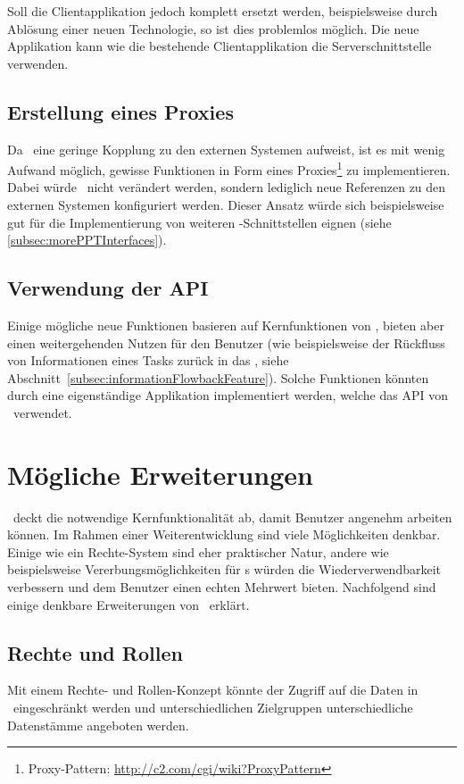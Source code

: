 			Soll die Clientapplikation jedoch komplett ersetzt werden, beispielsweise durch Ablösung einer neuen Technologie, so ist dies problemlos möglich.
			Die neue Applikation kann wie die bestehende Clientapplikation die Serverschnittstelle verwenden.
			

		\subsection{Erstellung eines Proxies}
			Da \eeppi\ eine geringe Kopplung zu den externen Systemen aufweist,
			 ist es mit wenig Aufwand möglich,
			gewisse Funktionen in Form eines Proxies\footnote{Proxy-Pattern: \url{http://c2.com/cgi/wiki?ProxyPattern}} zu implementieren.
			Dabei würde \eeppi\ nicht verändert werden,
			sondern lediglich neue Referenzen zu den externen Systemen konfiguriert werden.
			Dieser Ansatz würde sich beispielsweise gut für die Implementierung von weiteren \ppt-Schnittstellen eignen (siehe \ref{subsec:morePPTInterfaces}).
			
		\subsection{Verwendung der API}
			Einige mögliche neue Funktionen basieren auf Kernfunktionen von \eeppi,
			bieten aber einen weitergehenden Nutzen für den Benutzer
			(wie beispielsweise der Rückfluss von Informationen eines Tasks zurück in das \ttpl, siehe Abschnitt~\ref{subsec:informationFlowbackFeature}).
			Solche Funktionen könnten durch eine eigenständige Applikation implementiert werden,
			welche das API von \eeppi\ verwendet.


	\section{Mögliche Erweiterungen}
	\label{sec:possibleExtensions}
		\eeppi\ deckt die notwendige Kernfunktionalität ab, damit Benutzer angenehm arbeiten können.
		Im Rahmen einer Weiterentwicklung sind viele Möglichkeiten denkbar. 
		Einige wie ein Rechte-System sind eher praktischer Natur, 
		andere wie beispielsweise Vererbungsmöglichkeiten für \ttpl s würden die Wiederverwendbarkeit verbessern und dem Benutzer einen echten Mehrwert bieten.
		Nachfolgend sind einige denkbare Erweiterungen von \eeppi\ erklärt.
		
		\subsection{Rechte und Rollen}
			Mit einem Rechte- und Rollen-Konzept könnte der Zugriff auf die Daten in \eeppi\ eingeschränkt werden
			und unterschiedlichen Zielgruppen unterschiedliche Datenstämme angeboten werden.
			
